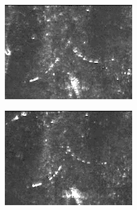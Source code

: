 \documentclass[%
 reprint,
 amsmath,amssymb,
 aps,
 prl,
]{revtex4-2}
\begin{document}
\begin{figure}[t]
	\centering
	\begin{subfigure}[b]{0.24\textwidth}
		\centering
		\includegraphics*[width=\textwidth]{exp-snap-1.png}
	\end{subfigure}
	\begin{subfigure}[b]{0.24\textwidth}
		\centering
		\includegraphics*[width=\textwidth]{exp-snap-2.png}
	\end{subfigure}
    \begin{subfigure}[b]{0.24\textwidth}
		\centering

\end{subfigure}
\end{figure}
\end{document}
